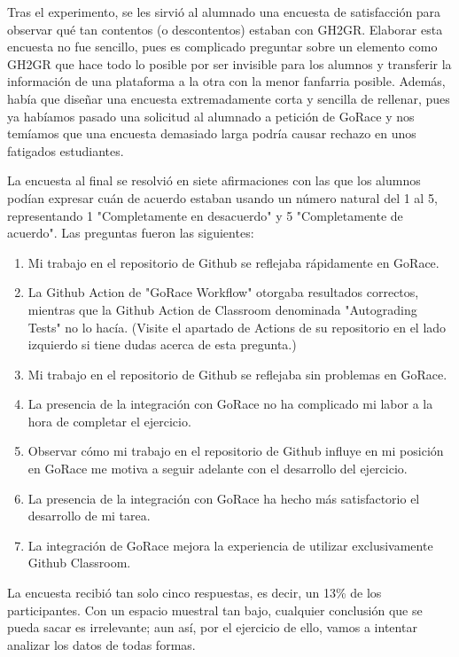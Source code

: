 Tras el experimento, se les sirvió al alumnado una encuesta de satisfacción para observar qué tan contentos (o descontentos) estaban con GH2GR. Elaborar esta encuesta no fue sencillo, pues es complicado preguntar sobre un elemento como GH2GR que hace todo lo posible por ser invisible para los alumnos y transferir la información de una plataforma a la otra con la menor fanfarria posible. Además, había que diseñar una encuesta extremadamente corta y sencilla de rellenar, pues ya habíamos pasado una solicitud al alumnado a petición de GoRace y nos temíamos que una encuesta demasiado larga podría causar rechazo en unos fatigados estudiantes.

La encuesta al final se resolvió en siete afirmaciones con las que los alumnos podían expresar cuán de acuerdo estaban usando un número natural del 1 al 5, representando 1 "Completamente en desacuerdo" y 5 "Completamente de acuerdo". Las preguntas fueron las siguientes:
\begin{enumerate}
    \item Mi trabajo en el repositorio de Github se reflejaba rápidamente en GoRace.
    \item La Github Action de "GoRace Workflow" otorgaba resultados correctos, mientras que la Github Action de Classroom denominada "Autograding Tests" no lo hacía. (Visite el apartado de Actions de su repositorio en el lado izquierdo si tiene dudas acerca de esta pregunta.)
    \item Mi trabajo en el repositorio de Github se reflejaba sin problemas en GoRace.
    \item La presencia de la integración con GoRace no ha complicado mi labor a la hora de completar el ejercicio.
    \item Observar cómo mi trabajo en el repositorio de Github influye en mi posición en GoRace me motiva a seguir adelante con el desarrollo del ejercicio.
    \item La presencia de la integración con GoRace ha hecho más satisfactorio el desarrollo de mi tarea.
    \item La integración de GoRace mejora la experiencia de utilizar exclusivamente Github Classroom.
\end{enumerate}

La encuesta recibió tan solo cinco respuestas, es decir, un 13\% de los participantes. Con un espacio muestral tan bajo, cualquier conclusión que se pueda sacar es irrelevante; aun así, por el ejercicio de ello, vamos a intentar analizar los datos de todas formas.


